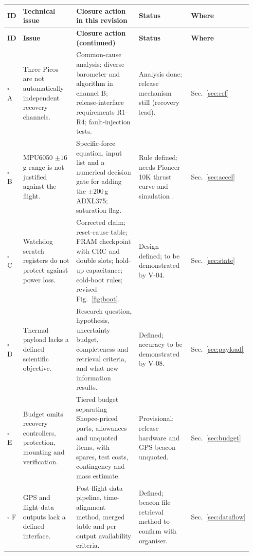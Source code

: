 \small
{}
\begin{longtable}{@{}L{8mm}L{36mm}L{56mm}L{28mm}L{18mm}@{}}
\toprule{}\textbf{ID}&\textbf{Technical issue}&\textbf{Closure action in this revision}&\textbf{Status}&\textbf{Where}\\\midrule\endfirsthead
\toprule{}\textbf{ID}&\textbf{Issue}&\textbf{Closure action (continued)}&\textbf{Status}&\textbf{Where}\\\midrule\endhead
\bottomrule\endlastfoot
$\square$ A & Three Picos are not automatically independent recovery channels. & Common-cause analysis; diverse barometer and algorithm in channel B; release-interface requirements R1--R4; fault-injection tests. & Analysis done; release mechanism still  (recovery lead). & Sec.~\ref{sec:ccf}\\
$\square$ B & MPU6050 $\pm16$\,g range is not justified against the flight. & Specific-force equation, input list and a numerical decision gate for adding the $\pm200$\,g ADXL375; saturation flag. & Rule defined; needs Pioneer-10K thrust curve and simulation . & Sec.~\ref{sec:accel}\\
$\square$ C & Watchdog scratch registers do not protect against power loss. & Corrected claim; reset-cause table; FRAM checkpoint with CRC and double slots; hold-up capacitance; cold-boot rules; revised Fig.~\ref{fig:boot}. & Design defined; to be demonstrated by V-04. & Sec.~\ref{sec:state}\\
$\square$ D & Thermal payload lacks a defined scientific objective. & Research question, hypothesis, uncertainty budget, completeness and retrieval criteria, and what new information results. & Defined; accuracy to be demonstrated by V-08. & Sec.~\ref{sec:payload}\\
$\square$ E & Budget omits recovery controllers, protection, mounting and verification. & Tiered budget separating Shopee-priced parts, allowances and unquoted items, with spares, test costs, contingency and mass estimate. & Provisional; release hardware and GPS beacon unquoted. & Sec.~\ref{sec:budget}\\
$\square$ F & GPS and flight-data outputs lack a defined interface. & Post-flight data pipeline, time-alignment method, merged table and per-output availability criteria. & Defined; beacon file retrieval method to confirm with organiser. & Sec.~\ref{sec:dataflow}\\
\end{longtable}
\normalsize

